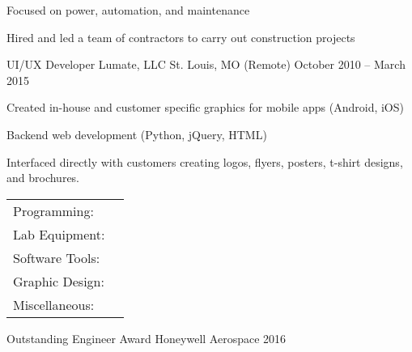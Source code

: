 \documentclass[]{awesome-cv}
\begin{document}
\begin{cventries}
{\begin{cvitems}
		\item {Focused on power, automation, and maintenance}
		\item {Hired and led a team of contractors to carry out construction projects}
		\end{cvitems}}
	\cventry
	{UI/UX Developer}
	{Lumate, LLC}
	{St. Louis, MO (Remote)}
	{October 2010 – March 2015}
	{\begin{cvitems}
		\item {Created in-house and customer specific graphics for mobile apps (Android, iOS)}
		\item {Backend web development (Python, jQuery, HTML)}
		\item {Interfaced directly with customers creating logos, flyers, posters, t-shirt designs, and brochures.}
		\end{cvitems}}
\end{cventries}
\begin{cventries}
	\cventry
	{}
	{\def\arraystretch{1.15}{\begin{tabular}{ l l }
		Programming:  & {\skill{ VB.NET, Python, Java, MATLAB, Powershell, Github, Subversion, TestStand, ADB, VISA}} \\
		Lab Equipment:  & {\skill{ Oscilloscopes, DMM, VNA, power supplies, multi-meters, Raspberry Pi, Arduino, PXI}} \\
		Software Tools:  & {\skill{ Schematic capture, PCB layout, Mentor Graphics, CADSTAR, OrCad, SPICE, Solidworks, CAD}} \\
		Graphic Design:  & {\skill{ Photoshop, Illustrator, LaTeX}} \\
		Miscellaneous:  & {\skill{ MS Office, MS Project, Excel, Android, Linux, Windows, Jira}} \\
		\end{tabular}}}
	{}
	{}
	{}
\end{cventries}

\vspace{-7mm}

\begin{cvhonors}
	\cvhonor
	{Outstanding Engineer Award}
	{Honeywell Aerospace }
	{}
	{2016}
\end{cvhonors}
\ 
\end{document}
